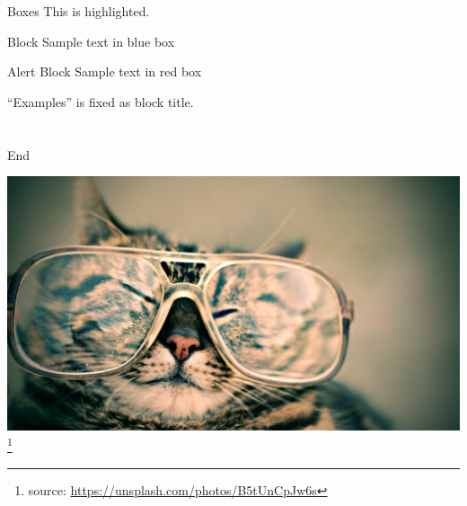 \documentclass[11pt,aspectratio=169]{beamer}
\begin{document}
\begin{frame}{Boxes}
This is \alert{highlighted}.
\begin{block}{Block}
Sample text in blue box
\end{block}
\begin{alertblock}{Alert Block}
Sample text in red box
\end{alertblock}
\begin{examples}
``Examples'' is fixed as block title.
\end{examples}
\end{frame}

\part{} %
\begin{frame}{End}
  \begin{center}
    \includegraphics[height=.7\textheight]{images/octavio-fossatti-37556.eps}
    \footnote[frame]{source:
    \href{https://unsplash.com/photos/B5tUnCpJw6s}
    {https://unsplash.com/photos/B5tUnCpJw6s}}
  \end{center}
\end{frame}


\appendix
\end{document}
